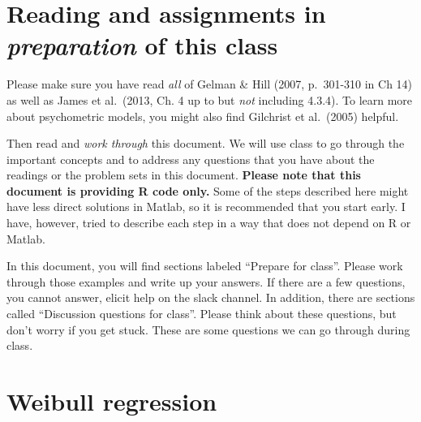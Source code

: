 \documentclass[
]{article}
\begin{document}
\hypertarget{reading-and-assignments-in-preparation-of-this-class}{%
\section{\texorpdfstring{Reading and assignments in \emph{preparation}
of this
class}{Reading and assignments in preparation of this class}}\label{reading-and-assignments-in-preparation-of-this-class}}

Please make sure you have read \emph{all} of Gelman \& Hill (2007,
p.~301-310 in Ch 14) as well as James et al.~(2013, Ch. 4 up to but
\emph{not} including 4.3.4). To learn more about psychometric models,
you might also find Gilchrist et al.~(2005) helpful.

Then read and \emph{work through} this document. We will use class to go
through the important concepts and to address any questions that you
have about the readings or the problem sets in this document.
\textbf{Please note that this document is providing R code only.} Some
of the steps described here might have less direct solutions in Matlab,
so it is recommended that you start early. I have, however, tried to
describe each step in a way that does not depend on R or Matlab.

In this document, you will find sections labeled ``Prepare for class''.
Please work through those examples and write up your answers. If there
are a few questions, you cannot answer, elicit help on the slack
channel. In addition, there are sections called ``Discussion questions
for class''. Please think about these questions, but don't worry if you
get stuck. These are some questions we can go through during class.

\hypertarget{weibull-regression}{%
\section{Weibull regression}\label{weibull-regression}}
\end{document}
